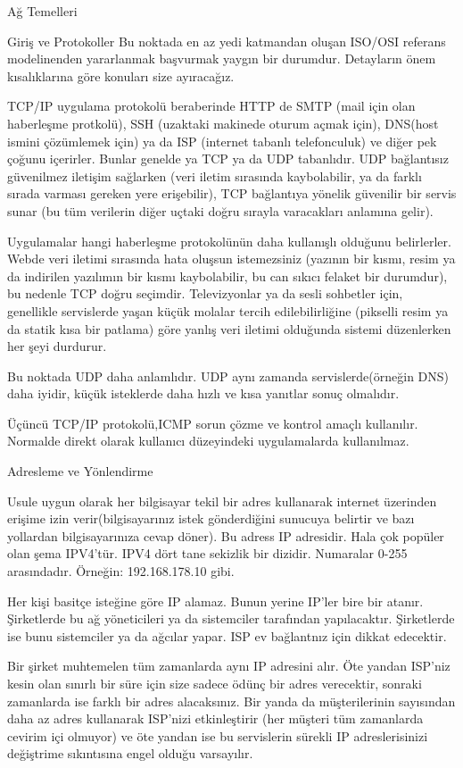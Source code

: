 \begin{section}{Ağ Temelleri}
\begin{subsection}{Giriş ve Protokoller}
Bu noktada en az yedi katmandan oluşan ISO/OSI referans modelinenden yararlanmak başvurmak yaygın bir durumdur. Detayların önem kısalıklarına göre konuları size ayıracağız.

TCP/IP uygulama protokolü beraberinde HTTP de SMTP (mail için olan haberleşme protkolü), SSH (uzaktaki makinede oturum açmak için), DNS(host ismini çözümlemek için) ya da ISP (internet tabanlı telefonculuk) ve diğer pek çoğunu içerirler. Bunlar genelde ya TCP ya da UDP tabanlıdır. UDP bağlantısız güvenilmez iletişim sağlarken (veri iletim sırasında kaybolabilir, ya da farklı sırada varması gereken yere erişebilir), TCP bağlantıya yönelik güvenilir bir servis sunar (bu tüm verilerin diğer uçtaki doğru sırayla varacakları anlamına gelir).

Uygulamalar hangi haberleşme protokolünün daha kullanışlı olduğunu belirlerler. Webde veri iletimi sırasında hata oluşsun istemezsiniz (yazının bir kısmı, resim ya da indirilen yazılımın bir kısmı kaybolabilir, bu can sıkıcı felaket bir durumdur), bu nedenle TCP doğru seçimdir. Televizyonlar ya da sesli sohbetler için, genellikle servislerde yaşan küçük molalar tercih edilebilirliğine (pikselli resim ya da statik kısa bir patlama) göre yanlış veri iletimi olduğunda sistemi düzenlerken her şeyi durdurur.

Bu noktada UDP daha anlamlıdır. UDP aynı zamanda servislerde(örneğin DNS) daha iyidir, küçük isteklerde daha hızlı ve kısa yanıtlar sonuç olmalıdır. 

Üçüncü TCP/IP protokolü,ICMP sorun çözme ve kontrol amaçlı kullanılır. Normalde direkt olarak kullanıcı düzeyindeki uygulamalarda kullanılmaz.
\end{subsection}
\begin{subsection}{Adresleme ve Yönlendirme}

Usule uygun olarak her bilgisayar tekil bir adres kullanarak internet üzerinden erişime izin verir(bilgisayarınız istek gönderdiğini sunucuya belirtir ve bazı yollardan bilgisayarınıza cevap döner). Bu adress IP adresidir. Hala çok popüler olan şema IPV4'tür. IPV4 dört tane sekizlik bir dizidir. Numaralar 0-255 arasındadır. Örneğin: 192.168.178.10 gibi. 

Her kişi basitçe isteğine göre IP alamaz. Bunun yerine IP'ler bire bir atanır. Şirketlerde bu ağ yöneticileri ya da sistemciler tarafından yapılacaktır. Şirketlerde ise bunu sistemciler ya da ağcılar yapar. ISP ev bağlantnız için dikkat edecektir.

Bir şirket muhtemelen tüm zamanlarda aynı IP adresini alır. Öte yandan ISP'niz kesin olan sınırlı bir süre için size sadece ödünç bir adres verecektir, sonraki zamanlarda ise farklı bir adres alacaksınız. Bir yanda da müşterilerinin sayısından daha az adres kullanarak ISP'nizi etkinleştirir (her müşteri tüm zamanlarda cevirim içi olmuyor) ve öte yandan ise bu servislerin sürekli IP adreslerisinizi değiştrime sıkıntısına engel olduğu varsayılır.


\end{subsection}
\end{section}
